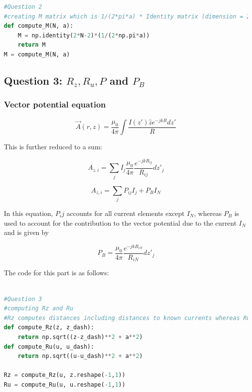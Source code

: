 \documentclass[11pt, a4paper]{article}
\begin{document}
\begin{lstlisting}[language = Python]
#Question 2
#creating M matrix which is 1/(2*pi*a) * Identity matrix (dimension = 2*N-2)
def compute_M(N, a):
    M = np.identity(2*N-2)*(1/(2*np.pi*a))
    return M
M = compute_M(N, a)

\end{lstlisting}

\subsection{Question 3: $R_z, R_u, P$ and $P_B$}

\subsubsection*{Vector potential equation}

\begin{equation*}
    \vec{A}(r, z) = \frac{\mu_0}{4\pi} \int \frac{I(z')\hat{z}e^{-jkR}dz'}{R}
\end{equation*}

This is further reduced to a sum:

\begin{equation*}
    A_{z, i} = \sum_j I_j \frac{\mu_0}{4\pi} \frac{e^{-jkR_{ij}}}{R_{ij}} dz'_j
\end{equation*}

\begin{equation*}
    A_{z, i} = \sum_j P_{ij} I_j + P_B I_N
\end{equation*}

In this equation, $P_ij$ accounts for all current elements except $I_N$, whereas $P_B$ is used to account for the contribution to the vector potential due to  the current $I_N$ and is given by 

\begin{equation*}
    P_B = \frac{\mu_0}{4\pi}  \frac{e^{-jkR_{iN}}}{R_{iN}}dz'_j
\end{equation*}

The code for this part is as follows:\\

\begin{lstlisting}[language = Python]

#Question 3
#computing Rz and Ru
#Rz computes distances including distances to known currents whereas Ru computes distances for only unknown currents
def compute_Rz(z, z_dash):
    return np.sqrt((z-z_dash)**2 + a**2)
def compute_Ru(u, u_dash):
    return np.sqrt((u-u_dash)**2 + a**2)

Rz = compute_Rz(u, z.reshape(-1,1))
Ru = compute_Ru(u, u.reshape(-1,1))

\end{lstlisting}
\end{document}
